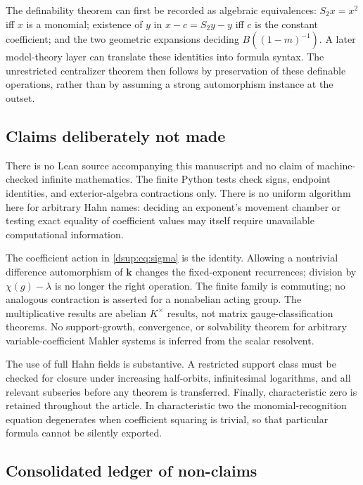 \documentclass[11pt,oneside]{article}
\numberwithin{equation}{section}
\theoremstyle{definition}
\theoremstyle{remark}
\newcommand{\kk}{\mathbf k}
\begin{document}
The definability theorem can first be recorded as algebraic equivalences:
$S_2x=x^2$ iff $x$ is a monomial; existence of $y$ in $x-c=S_2y-y$ iff $c$ is
the constant coefficient; and the two geometric expansions deciding
$B((1-m)^{-1})$. A later model-theory layer can translate these
identities into formula syntax. The unrestricted centralizer theorem
then follows by preservation of these definable operations, rather than
by assuming a strong automorphism instance at the outset.

\subsection{Claims deliberately not made}\label{dsup:sub:notmade}

There is no Lean source accompanying this manuscript and no claim of
machine-checked infinite mathematics. The finite Python tests check signs,
endpoint identities, and exterior-algebra contractions only. There is no
uniform algorithm here for arbitrary Hahn names: deciding an exponent's
movement chamber or testing exact equality of coefficient values may
itself require unavailable computational information.

The coefficient action in \eqref{dsup:eq:sigma} is the identity. Allowing a
nontrivial difference automorphism of $\kk$ changes the fixed-exponent
recurrences; division by $\chi(g)-\lambda$ is no longer the right
operation. The finite family is commuting; no analogous contraction is
asserted for a nonabelian acting group. The multiplicative results are
abelian $K^\times$ results, not matrix gauge-classification theorems.
No support-growth, convergence, or solvability theorem for arbitrary
variable-coefficient Mahler systems is inferred from the scalar
resolvent.

The use of full Hahn fields is substantive. A restricted support class
must be checked for closure under increasing half-orbits, infinitesimal
logarithms, and all relevant subseries before any theorem is transferred.
Finally, characteristic zero is retained throughout the article. In
characteristic two the monomial-recognition equation degenerates when
coefficient squaring is trivial, so that particular formula cannot be
silently exported.

\subsection{Consolidated ledger of non-claims}\label{dsup:sec:nonclaims}
\end{document}
